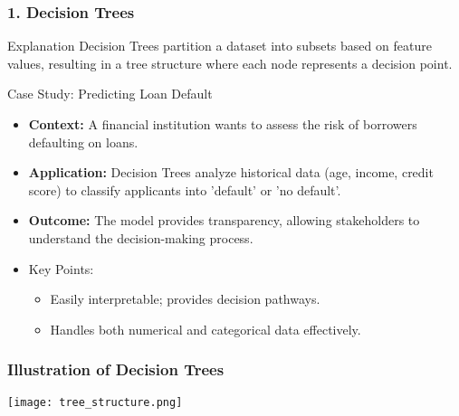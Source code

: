\documentclass[aspectratio=169]{beamer}
\begin{document}
\begin{frame}
    \frametitle{1. Decision Trees}
    \begin{block}{Explanation}
        Decision Trees partition a dataset into subsets based on feature values, resulting in a tree structure where each node represents a decision point.
    \end{block}
    
    \begin{block}{Case Study: Predicting Loan Default}
        \begin{itemize}
            \item \textbf{Context:} A financial institution wants to assess the risk of borrowers defaulting on loans.
            \item \textbf{Application:} Decision Trees analyze historical data (age, income, credit score) to classify applicants into 'default' or 'no default'.
            \item \textbf{Outcome:} The model provides transparency, allowing stakeholders to understand the decision-making process.
        \end{itemize}
    \end{block}

    \begin{itemize}
        \item Key Points:
        \begin{itemize}
            \item Easily interpretable; provides decision pathways.
            \item Handles both numerical and categorical data effectively.
        \end{itemize}
    \end{itemize}
\end{frame}

\begin{frame}[fragile]
    \frametitle{Illustration of Decision Trees}
    \begin{center}
        \texttt{[image: tree\_structure.png]} %
    \end{center}
\end{frame}
\end{document}
